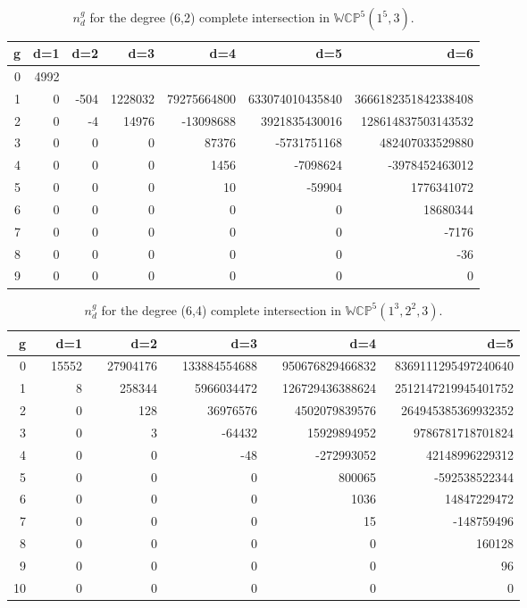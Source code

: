 \documentclass[12pt]{article}
\begin{document}
\begin{table}
\begin{centering}
\begin{tabular}{|r|rrrrrr|}
\hline
g &d=1 &d=2 &d=3 &d=4 &d=5 &d=6 \\
\hline
0&4992&\!\!\!\!\!\! 2388768& \!\!\!\!\!\! 2732060032&\!\!\!\!\!\! 4599616564224& \!\!\!\!\!\!9579713847066240& \!\!\!\!\!\! 22839268002374163616 \\
1&0& -504& 1228032& 79275664800& 633074010435840& 3666182351842338408 \\
2& 0& -4& 14976& -13098688& 3921835430016& 128614837503143532\\
3& 0& 0& 0& 87376& -5731751168& 482407033529880\\
4&0& 0& 0& 1456& -7098624& -3978452463012 \\
5&0& 0& 0& 10& -59904& 1776341072 \\
6& 0& 0& 0& 0& 0& 18680344\\
7&0& 0& 0& 0& 0& -7176 \\
8& 0& 0& 0&  0& 0& -36\\
9&0& 0& 0& 0& 0& 0\\
\hline
\end{tabular}
\caption{ $n^g_d$ for the degree (6,2) complete intersection in $\mathbb{WCP}^5(1^5,3)$.}
\end{centering}
\end{table}

\begin{table}
\begin{centering}
\begin{tabular}{|r|rrrrr|}
\hline
g &d=1 &d=2 &d=3 &d=4 &d=5  \\
\hline
0& \ \ 15552&\ \  27904176& \ \ 133884554688&\ \  950676829466832& \ 8369111295497240640\\
1& 8& 258344& 5966034472& 126729436388624& 2512147219945401752\\
2&0& 128& 36976576& 4502079839576& 264945385369932352\\
3&0& 3& -64432& 15929894952& 9786781718701824\\
4& 0& 0& -48& -272993052& 42148996229312 \\
5& 0& 0& 0& 800065& -592538522344\\
6& 0& 0& 0& 1036& 14847229472\\
7& 0& 0& 0& 15& -148759496\\
8& 0& 0& 0& 0& 160128\\
9& 0& 0& 0& 0& 96\\
10& 0& 0& 0& 0& 0\\
\hline
\end{tabular}
\caption{$n^g_d$ for the  degree (6,4) complete intersection in
$\mathbb{WCP}^5(1^3,2^2,3)$.}
\end{centering}
\end{table}
\end{document}
